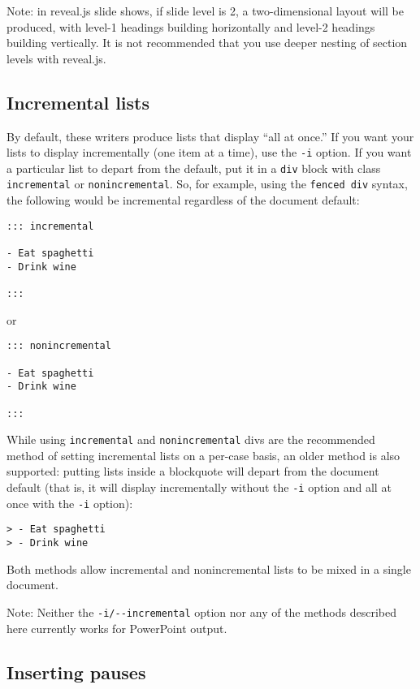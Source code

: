 \documentclass[]{article}
\begin{document}
Note: in reveal.js slide shows, if slide level is 2, a two-dimensional
layout will be produced, with level-1 headings building horizontally and
level-2 headings building vertically. It is not recommended that you use
deeper nesting of section levels with reveal.js.

\hypertarget{incremental-lists}{%
\subsection{Incremental lists}\label{incremental-lists}}

By default, these writers produce lists that display ``all at once.'' If
you want your lists to display incrementally (one item at a time), use
the \texttt{-i} option. If you want a particular list to depart from the
default, put it in a \texttt{div} block with class \texttt{incremental}
or \texttt{nonincremental}. So, for example, using the
\texttt{fenced\ div} syntax, the following would be incremental
regardless of the document default:

\begin{verbatim}
::: incremental

- Eat spaghetti
- Drink wine

:::
\end{verbatim}

or

\begin{verbatim}
::: nonincremental

- Eat spaghetti
- Drink wine

:::
\end{verbatim}

While using \texttt{incremental} and \texttt{nonincremental} divs are
the recommended method of setting incremental lists on a per-case basis,
an older method is also supported: putting lists inside a blockquote
will depart from the document default (that is, it will display
incrementally without the \texttt{-i} option and all at once with the
\texttt{-i} option):

\begin{verbatim}
> - Eat spaghetti
> - Drink wine
\end{verbatim}

Both methods allow incremental and nonincremental lists to be mixed in a
single document.

Note: Neither the \texttt{-i/-\/-incremental} option nor any of the
methods described here currently works for PowerPoint output.

\hypertarget{inserting-pauses}{%
\subsection{Inserting pauses}\label{inserting-pauses}}
\end{document}
